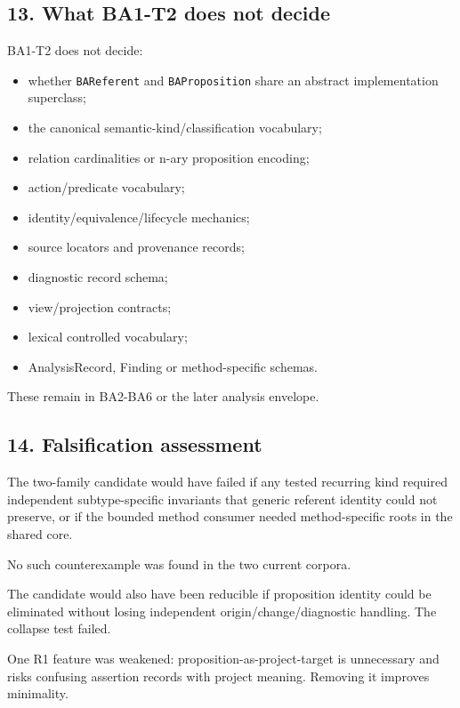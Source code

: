 \documentclass[
  10pt,
]{article}
\providecommand{\tightlist}{%
  \setlength{\itemsep}{0pt}\setlength{\parskip}{0pt}}
\begin{document}
\subsection{13. What BA1-T2 does not
decide}\label{what-ba1-t2-does-not-decide}

BA1-T2 does not decide:

\begin{itemize}
\tightlist
\item
  whether \texttt{BAReferent} and \texttt{BAProposition} share an
  abstract implementation superclass;
\item
  the canonical semantic-kind/classification vocabulary;
\item
  relation cardinalities or n-ary proposition encoding;
\item
  action/predicate vocabulary;
\item
  identity/equivalence/lifecycle mechanics;
\item
  source locators and provenance records;
\item
  diagnostic record schema;
\item
  view/projection contracts;
\item
  lexical controlled vocabulary;
\item
  AnalysisRecord, Finding or method-specific schemas.
\end{itemize}

These remain in BA2-BA6 or the later analysis envelope.

\subsection{14. Falsification
assessment}\label{falsification-assessment}

The two-family candidate would have failed if any tested recurring kind
required independent subtype-specific invariants that generic referent
identity could not preserve, or if the bounded method consumer needed
method-specific roots in the shared core.

No such counterexample was found in the two current corpora.

The candidate would also have been reducible if proposition identity
could be eliminated without losing independent origin/change/diagnostic
handling. The collapse test failed.

One R1 feature was weakened: proposition-as-project-target is
unnecessary and risks confusing assertion records with project meaning.
Removing it improves minimality.
\end{document}

